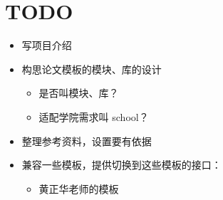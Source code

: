 

\chapter{TODO}

\newcommand\DN{\faCheckSquare[regular]} %
\newcommand\HDN{\faMinusSquare[regular]} %
\newcommand\NDN{\faSquare[regular]} %
\newcommand\SDN{\faPlusSquare[regular]} %

\goodbreak
\begin{itemize}[midpenalty=-1000,
  label=\protect\raisebox{-.3ex}{\NDN}]
  \item 写项目介绍
  \item 构思论文模板的模块、库的设计
    \begin{itemize}
      \item 是否叫模块、库？
      \item 适配学院需求叫 school？
    \end{itemize}
  \item 整理参考资料，设置要有依据
  \item 兼容一些模板，提供切换到这些模板的接口：
    \begin{itemize}
      \item 黄正华老师的模板
    \end{itemize}
\end{itemize}